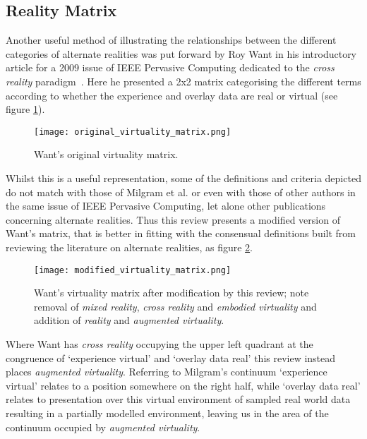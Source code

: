 


\subsection{Reality Matrix}
\label{subsec:reality_matrix}
Another useful method of illustrating the relationships between the different categories of alternate realities was put forward by Roy Want in his introductory article for a 2009 issue of IEEE Pervasive Computing dedicated to the \textit{cross reality} paradigm~\cite{Want2009}. Here he presented a 2x2 matrix categorising the different terms according to whether the experience and overlay data are real or virtual (see figure \ref{original_virtuality_matrix.png}).

\begin{figure}[h]
\centering
\texttt{[image: original\_virtuality\_matrix.png]}
\caption{Want's original virtuality matrix.}
\label{original_virtuality_matrix.png}
\end{figure}

Whilst this is a useful representation, some of the definitions and criteria depicted do not match with those of Milgram et al. or even with those of other authors in the same issue of IEEE Pervasive Computing, let alone other publications concerning alternate realities. Thus this review presents a modified version of Want's matrix, that is better in fitting with the consensual definitions built from reviewing the literature on alternate realities, as figure \ref{modified_virtuality_matrix.png}.

\begin{figure}[h]
\centering
\texttt{[image: modified\_virtuality\_matrix.png]}
\caption{Want's virtuality matrix after modification by this review; note removal of \textit{mixed reality}, \textit{cross reality} and \textit{embodied virtuality} and addition of \textit{reality} and \textit{augmented virtuality}.}
\label{modified_virtuality_matrix.png}
\end{figure}

Where Want has \textit{cross reality} occupying the upper left quadrant at the congruence of `experience virtual' and `overlay data real' this review instead places \textit{augmented virtuality}. Referring to Milgram's continuum `experience virtual' relates to a position somewhere on the right half, while `overlay data real' relates to presentation over this virtual environment of sampled real world data resulting in a partially modelled environment, leaving us in the area of the continuum occupied by \textit{augmented virtuality}.

